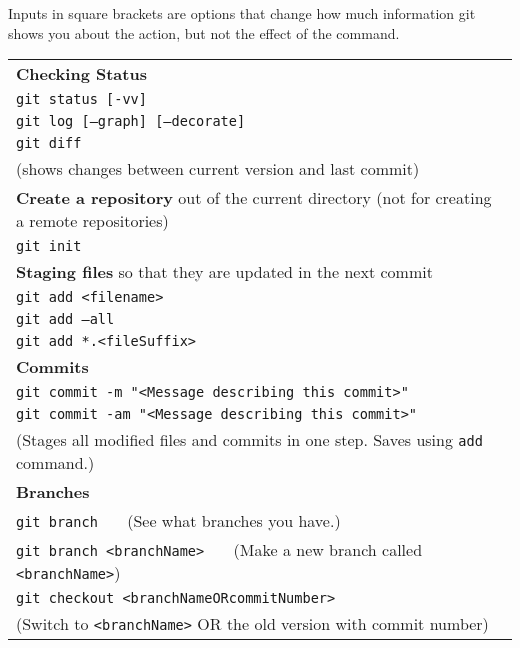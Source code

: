 \documentclass[11pt]{article}
\newcommand{\smallbold}[1]{\footnotesize\textbf{#1}}
\begin{document}
{\small Inputs in square brackets are options that change how much information git shows you about the action, but not the effect of the command.

\begin{center}
\begin{tabular}{|l|}
\hline
\smallbold{Checking Status}\\
\quad \texttt{git status [-vv]}\\

\quad\texttt{git log [--graph] [--decorate]}\\

\quad \texttt{git diff}\\
\quad \quad(shows changes between current version and last commit)\\
\hline
\smallbold{Create a repository} out of the current directory (not for creating a remote repositories)\\
\quad \texttt{git init}\\
\hline
\smallbold{Staging files} so that they are updated in the next commit\\
\quad \texttt{git add <filename>}\\

\quad \texttt{git add --all}\\

\quad \texttt{git add *.<fileSuffix>}\\
\hline
\smallbold{Commits}\\
 \quad \texttt{git commit -m "<Message describing this commit>"}\\

\quad \texttt{git commit -am "<Message describing this commit>"}\\
\quad \quad (Stages all modified files and commits in one step.  Saves using \texttt{add} command.)\\

\hline
\smallbold{Branches}\\

\quad \texttt{git branch}  \ \ \ (See what branches you have.)\\ 

\quad \texttt{git branch <branchName>} \ \ \ (Make a new branch called \texttt{<branchName>})\\

\quad \texttt{git checkout <branchNameORcommitNumber>} \\
\quad \quad(Switch to \texttt{<branchName>} OR the old version with commit number)\\



\end{tabular}
\end{center}}
\end{document}
